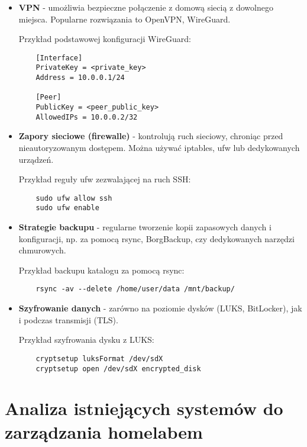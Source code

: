 \begin{itemize}
    \item \textbf{VPN} - umożliwia bezpieczne połączenie z domową siecią z dowolnego miejsca. Popularne rozwiązania to OpenVPN, WireGuard.
    
    Przykład podstawowej konfiguracji WireGuard:
    \begin{lstlisting}
    [Interface]
    PrivateKey = <private_key>
    Address = 10.0.0.1/24

    [Peer]
    PublicKey = <peer_public_key>
    AllowedIPs = 10.0.0.2/32
    \end{lstlisting}

    \item \textbf{Zapory sieciowe (firewalle)} - kontrolują ruch sieciowy, chroniąc przed nieautoryzowanym dostępem. Można używać iptables, ufw lub dedykowanych urządzeń.

    Przykład reguły ufw zezwalającej na ruch SSH:
    \begin{lstlisting}
    sudo ufw allow ssh
    sudo ufw enable
    \end{lstlisting}

    \item \textbf{Strategie backupu} - regularne tworzenie kopii zapasowych danych i konfiguracji, np. za pomocą rsync, BorgBackup, czy dedykowanych narzędzi chmurowych.

    Przykład backupu katalogu za pomocą rsync:
    \begin{lstlisting}
    rsync -av --delete /home/user/data /mnt/backup/
    \end{lstlisting}

    \item \textbf{Szyfrowanie danych} - zarówno na poziomie dysków (LUKS, BitLocker), jak i podczas transmisji (TLS).

    Przykład szyfrowania dysku z LUKS:
    \begin{lstlisting}
    cryptsetup luksFormat /dev/sdX
    cryptsetup open /dev/sdX encrypted_disk
    \end{lstlisting}
\end{itemize}

\section{Analiza istniejących systemów do zarządzania homelabem}
